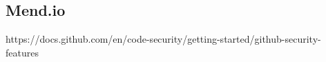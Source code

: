 \subsection{Mend.io} \label{sec:Mend-io}
https://docs.github.com/en/code-security/getting-started/github-security-features